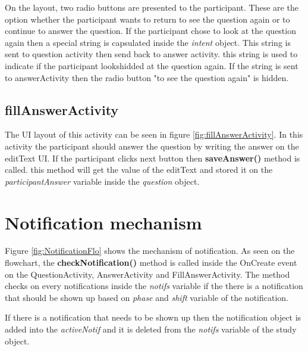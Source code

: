 On the layout, two radio buttons are presented to the participant. These are the option whether the participant wants to return to see the question again or to continue
 to answer the question.
If the participant chose to look at the question again then a special string is capsulated inside the \textit{intent} object.
This string is sent to question activity then send back to answer activity. this string is used to indicate if the participant lookshidded at the question again.
If the string is sent to answerActivity then the radio button "to see the question again" is hidden.


\subsection{fillAnswerActivity}
The UI layout of this activity can be seen in figure \ref{fig:fillAnswerActivity}.
In this activity the participant should answer the question by writing the answer on the editText UI.
If the participant clicks next button then \textbf{saveAnswer()} method is called. this method will get the value of the editText
and stored it on the \textit{participantAnswer} variable inside the \textit{question} object.


\section{Notification mechanism}
Figure \ref{fig:NotificationFlo} shows the mechanism of notification.
As seen on the flowchart, the \textbf{checkNotification()} method is called inside
the OnCreate event on the QuestionActivity, AnswerActivity and FillAnswerActivity.
The method checks on every notifications inside the \textit{notifs} variable if the there is a notification that should be shown up based on \textit{phase} and \textit{shift} variable of the notification.

If there  is a notification that needs to be shown up then the notification object is added into the \textit{activeNotif} and it is deleted from the \textit{notifs} variable of the study object.

